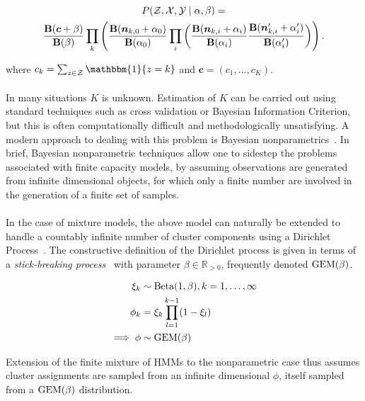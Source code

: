 \documentclass[12pt]{report}
\newcommand{\p}[0]{\prime}
\newcommand{\1}[0]{\mathbbm{1}}
\newcommand{\Beta}[0]{\textnormal{Beta}}
\newcommand{\GEM}[0]{\textnormal{GEM}}
\newcommand{\Bf}[0]{\text{\textbf{B}}}
\begin{document}
\begin{multline}
    P(\mathcal{Z}, \mathcal{X}, \mathcal{Y} \mid \alpha, \beta) = \\
    \frac{\Bf(\bm{c} + \beta)}{\Bf(\beta)}
    \prod_k
    \left(
        \frac{\Bf(\bm{n}_{k,0} + \alpha_0)}{\Bf(\alpha_0)}
        \prod_i
        \left(
            \frac{\Bf(\bm{n}_{k,i} + \alpha_i)}{\Bf(\alpha_i)}
            \frac{\Bf(\bm{n}_{k,i}^\p + \alpha_i^\p)}{\Bf(\alpha_i^\p)}
        \right)
    \right). \label{eq:joint-marg-finite-mixture}
\end{multline}

where $c_k = \sum_{z \in \mathcal{Z}}\1\{z = k\}$ and $\bm{c} = (c_1, \ldots, c_K)$.
\\\\
In many situations $K$ is unknown. Estimation of $K$ can be carried out using standard
techniques such as cross validation or Bayesian Information Criterion, but this is
often computationally difficult and methodologically unsatisfying. A modern
approach to dealing with this problem is Bayesian nonparametrics~\cite{jordan-bayesian-nonparam}.
In brief, Bayesian nonparametric techniques allow one to sidestep the problems associated with finite
capacity models, by assuming observations are generated from infinite dimensional objects,
for which only a finite number are involved in the generation of a finite set of samples.
\\\\
In the case of mixture models, the above model can naturally be extended to handle a
countably infinite number of cluster components using a Dirichlet Process~\cite{teh-dirichlet}.
The constructive definition of the Dirichlet process is given in terms of a
\emph{stick-breaking process}~\cite{sethuraman-constructive} with parameter
$\beta \in \mathbb{R}_{>0}$, frequently denoted $\GEM(\beta)$.

\begin{align*}
    \xi_k & \sim \Beta(1, \beta), k = 1,\ldots,\infty\\
    \phi_k & = \xi_k \prod_{l=1}^{k-1} (1 - \xi_l) \\
    \implies \phi & \sim \GEM(\beta) \\
\end{align*}

Extension of the finite mixture of \acp{HMM} to the nonparametric case thus assumes cluster
assignments are sampled from an infinite dimensional $\phi$, itself sampled
from a $\GEM(\beta)$ distribution.
\end{document}
